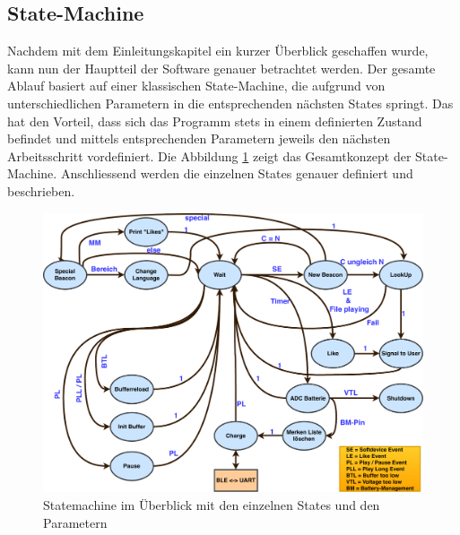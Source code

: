 \subsection{State-Machine}\label{sec:stateMachine}

Nachdem mit dem Einleitungskapitel ein kurzer Überblick geschaffen wurde, kann nun der Hauptteil der Software genauer betrachtet werden. Der gesamte Ablauf basiert auf einer klassischen State-Machine, die aufgrund von unterschiedlichen Parametern in die entsprechenden nächsten States springt. Das hat den Vorteil, dass sich das Programm stets in einem definierten Zustand befindet und mittels entsprechenden Parametern jeweils den nächsten Arbeitsschritt vordefiniert. Die Abbildung \ref{fig:completeStateMachine} zeigt das Gesamtkonzept der State-Machine. Anschliessend werden die einzelnen States genauer definiert und beschrieben.

\begin{figure}[htbp]
	\centering
	\includegraphics[width=1.01\textwidth]{Data/StateMachineFinal.pdf}
	\caption[Statemachine-Diagramm]{Statemachine im Überblick mit den einzelnen States und den Parametern}
	\label{fig:completeStateMachine}
\end{figure} 

